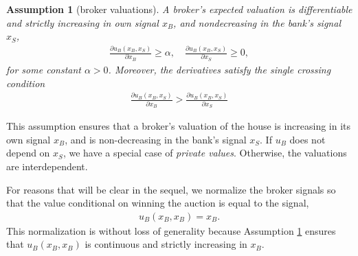\documentclass[11pt,twopage]{article}
\newtheorem{assumption}{Assumption}
{\bf}{\it}
\begin{document}
\begin{assumption}[broker valuations]\label{as:valuations}
A broker's expected valuation is differentiable and strictly increasing in own signal $x_B$, and nondecreasing in the bank's signal $x_S$, 
\begin{align}
  \frac{\partial u_B(x_B,x_S)}{\partial x_B}\geq \alpha,\quad
  \frac{\partial u_B(x_B,x_S)}{\partial x_S} \geq 0, \nonumber
\end{align}
for some constant $\alpha>0$.
Moreover, the derivatives satisfy the \emph{single crossing} condition 
\begin{align}
  \frac{\partial u_B(x_B,x_S)}{\partial x_B}>\frac{\partial u_B(x_B,x_S)}{\partial x_S} \nonumber
\end{align}

\label{as:utilities}
\end{assumption}




This assumption ensures that a broker's valuation of the house is
increasing in its own signal $x_B$, and is
non-decreasing in the bank's signal $x_S$. If $u_B$ does not
depend on $x_S$, we have a special case of \emph{private values}. Otherwise, the valuations are interdependent. 



For reasons that will be clear in the sequel, we normalize the broker signals so that the value conditional on winning the auction is equal to the signal,
\begin{align}
u_B(x_B,x_B) = x_B.
\label{bnorm}
\end{align}
This normalization is without loss of generality because Assumption \ref{as:valuations} ensures that $u_B(x_B,x_B)$ is continuous and strictly increasing in $x_B$.
\end{document}
